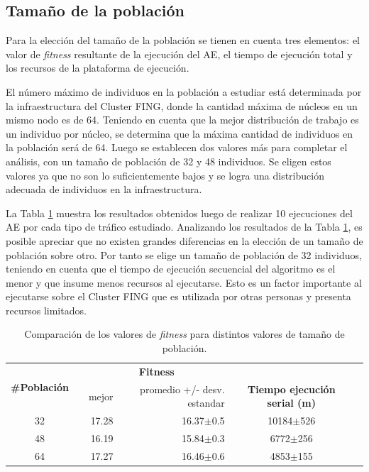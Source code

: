\subsection{Tamaño de la población}

Para la elección del tamaño de la población se tienen en cuenta tres elementos: el valor de \emph{fitness} resultante de la ejecución del AE, el tiempo de ejecución total y los recursos de la plataforma de ejecución.

El número máximo de individuos en la población a estudiar está determinada por la infraestructura del Cluster FING, donde la cantidad máxima de núcleos en un mismo nodo es de 64. Teniendo en cuenta que la mejor distribución de trabajo es un individuo por núcleo, se determina que la máxima cantidad de individuos en la población será de 64. Luego se establecen dos valores más para completar el análisis, con un tamaño de población de 32 y 48 individuos. Se eligen estos valores ya que no son lo suficientemente bajos y se logra una distribución adecuada de individuos en la infraestructura.

La Tabla \ref{table:parametro_poblacion} muestra los resultados obtenidos luego de realizar 10 ejecuciones del AE por cada tipo de tráfico estudiado. Analizando los resultados de la Tabla \ref{table:parametro_poblacion}, es posible apreciar que no existen grandes diferencias en la elección de un tamaño de población sobre otro. Por tanto se elige un tamaño de población de 32 individuos, teniendo en cuenta que el tiempo de ejecución secuencial del algoritmo es el menor y que insume menos recursos al ejecutarse. Esto es un factor importante al ejecutarse sobre el Cluster FING que es utilizada por otras personas y presenta recursos limitados.

\begin{table}[h]
	\renewcommand{\arraystretch}{1.2}
	\caption{Comparación de los valores de \emph{fitness} para distintos valores de tamaño de población.}
	\label{table:parametro_poblacion}
	\centering
	\begin{tabular}{ccrrcp{2cm}}
		\hline
	    \multirow{2}{*}{\textbf{\#Población}}& & 
		\multicolumn{2}{c}{\textbf{Fitness}} \\
		\cline{3-4}
		& & {mejor} 
		& {promedio +/- desv. estandar} 
		& \textbf{Tiempo ejecución serial (m)} \\
		\hline
		32 & & {17.28} & 16.37$\pm$0.5 & 10184$\pm$526\\
		48 & & {16.19} & 15.84$\pm$0.3 & 6772$\pm$256\\
		64 & & {17.27} & 16.46$\pm$0.6 & 4853$\pm$155\\
		\hline
	\end{tabular}
\end{table}


